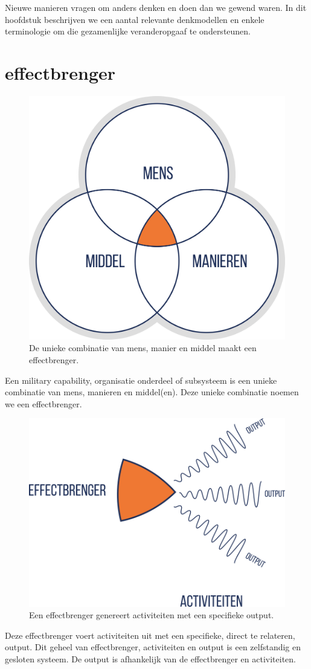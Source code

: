 \documentclass[
]{book}
\begin{document}
Nieuwe manieren vragen om anders denken en doen dan we gewend waren. In dit hoofdstuk beschrijven we een aantal relevante denkmodellen en enkele terminologie om die gezamenlijke veranderopgaaf te ondersteunen.

\hypertarget{effectbrenger}{%
\section{effectbrenger}\label{effectbrenger}}

\begin{figure}

{\centering \includegraphics[width=0.35\linewidth]{data/images/20210324-MDI-mmm-model} 

}

\caption{De unieke combinatie van mens, manier en middel maakt een effectbrenger.}\label{fig:mmm-model}
\end{figure}

Een military capability, organisatie onderdeel of subsysteem is een unieke combinatie van mens, manieren en middel(en). Deze unieke combinatie noemen we een effectbrenger.

\begin{figure}

{\centering \includegraphics[width=0.45\linewidth]{data/images/20210324-MDI-effectbrenger} 

}

\caption{Een effectbrenger genereert activiteiten met een specifieke output.}\label{fig:effectbrenger}
\end{figure}

Deze effectbrenger voert activiteiten uit met een specifieke, direct te relateren, output. Dit geheel van effectbrenger, activiteiten en output is een zelfstandig en gesloten systeem. De output is afhankelijk van de effectbrenger en activiteiten.
\end{document}
